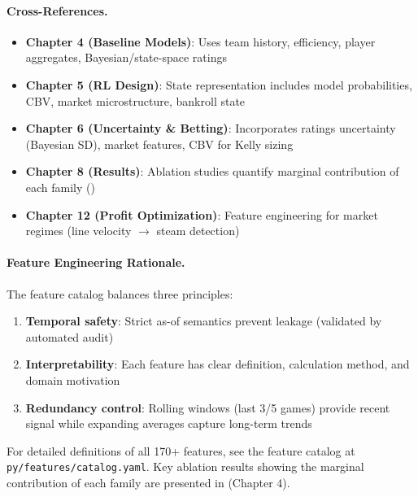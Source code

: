 \paragraph{Cross-References.}
\begin{itemize}
    \item \textbf{Chapter 4 (Baseline Models)}: Uses team history, efficiency, player aggregates, Bayesian/state-space ratings
    \item \textbf{Chapter 5 (RL Design)}: State representation includes model probabilities, CBV, market microstructure, bankroll state
    \item \textbf{Chapter 6 (Uncertainty \& Betting)}: Incorporates ratings uncertainty (Bayesian SD), market features, CBV for Kelly sizing
    \item \textbf{Chapter 8 (Results)}: Ablation studies quantify marginal contribution of each family ()
    \item \textbf{Chapter 12 (Profit Optimization)}: Feature engineering for market regimes (line velocity $\to$ steam detection)
\end{itemize}

\paragraph{Feature Engineering Rationale.}
The feature catalog balances three principles:
\begin{enumerate}
    \item \textbf{Temporal safety}: Strict as-of semantics prevent leakage (validated by automated audit)
    \item \textbf{Interpretability}: Each feature has clear definition, calculation method, and domain motivation
    \item \textbf{Redundancy control}: Rolling windows (last 3/5 games) provide recent signal while expanding averages capture long-term trends
\end{enumerate}

For detailed definitions of all 170+ features, see the feature catalog at \texttt{py/features/catalog.yaml}. Key ablation results showing the marginal contribution of each family are presented in  (Chapter 4).
